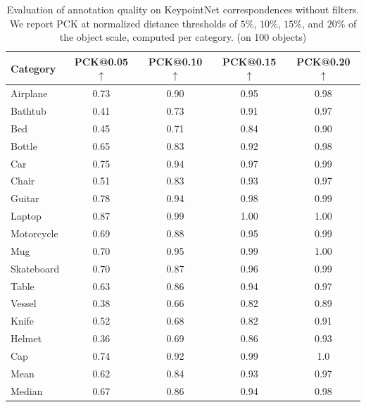 \begin{table}[h]
  \caption{Evaluation of annotation quality on KeypointNet correspondences without filters. We report PCK at normalized distance thresholds of $5\%$, $10\%$, $15\%$, and $20\%$ of the object scale, computed per category. (on 100 objects)}
  \label{tab:unfiltered}

  \centering
  \begin{tabular}{lcccc}
    \toprule
    Category & PCK@0.05 $\uparrow$ & PCK@0.10 $\uparrow$ & PCK@0.15 $\uparrow$ & PCK@0.20 $\uparrow$ \\
    \midrule
    Airplane   & 0.73 & 0.90 & 0.95 & 0.98 \\
    Bathtub    & 0.41 & 0.73 & 0.91 & 0.97 \\
    Bed        & 0.45 & 0.71 & 0.84 & 0.90 \\
    Bottle     & 0.65 & 0.83 & 0.92 & 0.98 \\
    Car        & 0.75 & 0.94 & 0.97 & 0.99 \\
    Chair      & 0.51 & 0.83 & 0.93 & 0.97 \\
    Guitar     & 0.78 & 0.94 & 0.98 & 0.99 \\
    Laptop     & 0.87 & 0.99 & 1.00 & 1.00 \\
    Motorcycle & 0.69 & 0.88 & 0.95 & 0.99 \\
    Mug        & 0.70 & 0.95 & 0.99 & 1.00 \\
    Skateboard & 0.70 & 0.87 & 0.96 & 0.99 \\
    Table      & 0.63 & 0.86 & 0.94 & 0.97 \\
    Vessel     & 0.38 & 0.66 & 0.82 & 0.89 \\
    Knife     & 0.52 & 0.68 & 0.82 & 0.91 \\ 
    Helmet & 0.36 & 0.69 & 0.86 & 0.93 \\ 
    Cap & 0.74 & 0.92 & 0.99 & 1.0\\
    \midrule
    Mean   & 0.62 & 0.84 & 0.93 & 0.97 \\
    Median & 0.67 & 0.86 & 0.94 & 0.98 \\
    \bottomrule
  \end{tabular}

\end{table}
 